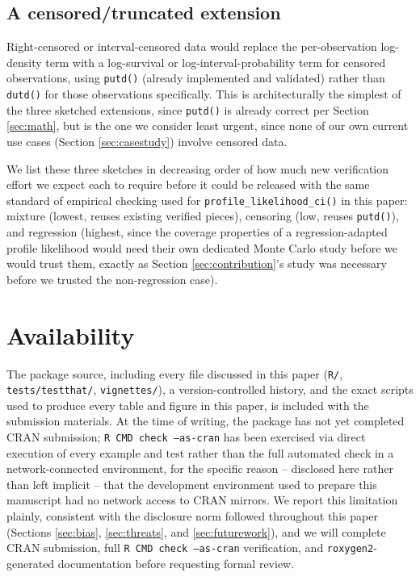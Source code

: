 \subsection{A censored/truncated extension}

Right-censored or interval-censored data would replace the
per-observation log-density term with a log-survival or log-interval-probability
term for censored observations, using \texttt{putd()} (already
implemented and validated) rather than \texttt{dutd()} for those
observations specifically. This is architecturally the simplest of the
three sketched extensions, since \texttt{putd()} is already correct per
Section \ref{sec:math}, but is the one we consider least urgent, since
none of our own current use cases (Section \ref{sec:casestudy}) involve
censored data.

We list these three sketches in decreasing order of how much new
verification effort we expect each to require before it could be
released with the same standard of empirical checking used for
\texttt{profile\_likelihood\_ci()} in this paper: mixture (lowest, reuses
existing verified pieces), censoring (low, reuses \texttt{putd()}), and
regression (highest, since the coverage properties of a
regression-adapted profile likelihood would need their own dedicated
Monte Carlo study before we would trust them, exactly as Section
\ref{sec:contribution}'s study was necessary before we trusted the
non-regression case).

\section{Availability}
\label{sec:availability}

The package source, including every file discussed in this paper
(\texttt{R/}, \texttt{tests/testthat/}, \texttt{vignettes/}), a
version-controlled history, and the exact scripts used to produce every
table and figure in this paper, is included with the submission
materials. At the time of writing, the package has not yet completed
CRAN submission; \texttt{R CMD check --as-cran} has been exercised via
direct execution of every example and test rather than the full
automated check in a network-connected environment, for the specific
reason -- disclosed here rather than left implicit -- that the
development environment used to prepare this manuscript had no network
access to CRAN mirrors. We report this limitation plainly, consistent
with the disclosure norm followed throughout this paper (Sections
\ref{sec:bias}, \ref{sec:threats}, and \ref{sec:futurework}), and we
will complete CRAN submission, full \texttt{R CMD check --as-cran}
verification, and \texttt{roxygen2}-generated documentation before
requesting formal review.

